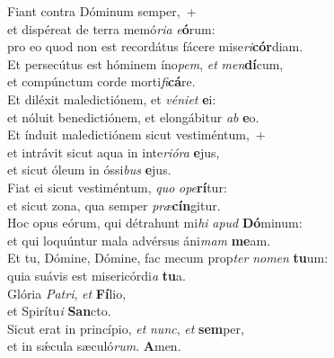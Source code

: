 \evenverse Fiant contra Dóminum semper,~+\\\evenverse  et dispéreat de terra memó\textit{ri}\textit{a} \textit{e}\textbf{ó}rum:~\*\\
\evenverse pro eo quod non est recordátus fácere mise\textit{ri}\textbf{cór}diam.\\
\oddverse Et persecútus est hóminem íno\textit{pem}, \textit{et} \textit{men}\textbf{dí}cum,~\*\\
\oddverse et compúnctum corde morti\textit{fi}\textbf{cá}re.\\
\evenverse Et diléxit maledictiónem, et \textit{vé}\textit{ni}\textit{et} \textbf{e}i:~\*\\
\evenverse et nóluit benedictiónem, et elongábitur \textit{ab} \textbf{e}o.\\
\oddverse Et índuit maledictiónem sicut vestiméntum,~+\\
\oddverse  et intrávit sicut aqua in inte\textit{ri}\textit{ó}\textit{ra} \textbf{e}jus,~\*\\
\oddverse et sicut óleum in óssi\textit{bus} \textbf{e}jus.\\
\evenverse Fiat ei sicut vestiméntum, \textit{quo} \textit{o}\textit{pe}\textbf{rí}tur:~\*\\
\evenverse et sicut zona, qua semper \textit{præ}\textbf{cín}gitur.\\
\oddverse Hoc opus eórum, qui détrahunt mi\textit{hi} \textit{a}\textit{pud} \textbf{Dó}minum:~\*\\
\oddverse et qui loquúntur mala advérsus áni\textit{mam} \textbf{me}am.\\
\evenverse Et tu, Dómine, Dómine, fac mecum prop\textit{ter} \textit{no}\textit{men} \textbf{tu}um:~\*\\
\evenverse quia suávis est misericórdi\textit{a} \textbf{tu}a.\\
\oddverse Glória \textit{Pa}\textit{tri}, \textit{et} \textbf{Fí}lio,~\*\\
\oddverse et Spirítu\textit{i} \textbf{San}cto.\\
\evenverse Sicut erat in princípio, \textit{et} \textit{nunc}, \textit{et} \textbf{sem}per,~\*\\
\evenverse et in sǽcula sæculó\textit{rum}. \textbf{A}men.\\
